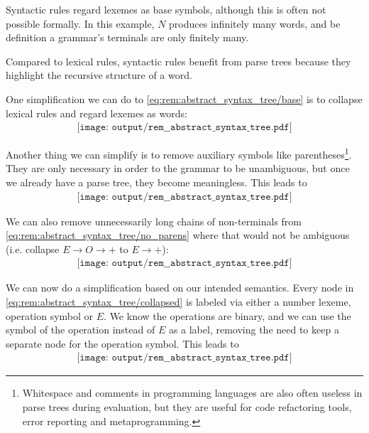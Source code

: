 \begin{remark}
\begin{thmenum}
    Syntactic rules regard lexemes as base symbols, although this is often not possible formally. In this example, \( N \) produces infinitely many words, and be definition a grammar's terminals are only finitely many.

    Compared to lexical rules, syntactic rules benefit from parse trees because they highlight the recursive structure of a word.
  \end{thmenum}

  One simplification we can do to \eqref{eq:rem:abstract_syntax_tree/base} is to collapse lexical rules and regard lexemes as words:
  \begin{equation}\label{eq:rem:abstract_syntax_tree/syntactic}
    \begin{aligned}
      \texttt{[image: output/rem\_\_abstract\_syntax\_tree.pdf]}
    \end{aligned}
  \end{equation}

  Another thing we can simplify is to remove auxiliary symbols like parentheses\footnote{Whitespace and comments in programming languages are also often useless in parse trees during evaluation, but they are useful for code refactoring tools, error reporting and metaprogramming.}. They are only necessary in order to the grammar to be unambiguous, but once we already have a parse tree, they become meaningless. This leads to
  \begin{equation}\label{eq:rem:abstract_syntax_tree/no_parens}
    \begin{aligned}
      \texttt{[image: output/rem\_\_abstract\_syntax\_tree.pdf]}
    \end{aligned}
  \end{equation}

  We can also remove unnecessarily long chains of non-terminals from \eqref{eq:rem:abstract_syntax_tree/no_parens} where that would not be ambiguous (i.e. collapse \( E \to O \to + \) to \( E \to + \)):
  \begin{equation}\label{eq:rem:abstract_syntax_tree/collapsed}
    \begin{aligned}
      \texttt{[image: output/rem\_\_abstract\_syntax\_tree.pdf]}
    \end{aligned}
  \end{equation}

  We can now do a simplification based on our intended semantics. Every node in \eqref{eq:rem:abstract_syntax_tree/collapsed} is labeled via either a number lexeme, operation symbol or \( E \). We know the operations are binary, and we can use the symbol of the operation instead of \( E \) as a label, removing the need to keep a separate node for the operation symbol. This leads to
  \begin{equation}\label{eq:rem:abstract_syntax_tree/final}
    \begin{aligned}
      \texttt{[image: output/rem\_\_abstract\_syntax\_tree.pdf]}
    \end{aligned}
  \end{equation}


\end{remark}
